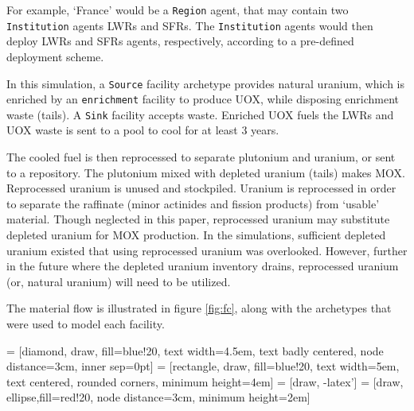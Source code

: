 For example, `France' would be a \texttt{Region} agent,
that may contain two \texttt{Institution} agents \glspl{LWR}
and \glspl{SFR}. The \texttt{Institution} agents would then deploy
\glspl{LWR} and \glspl{SFR} agents, respectively, according to a pre-defined deployment
scheme. 

In this simulation, a \texttt{Source} facility archetype provides natural 
uranium, which is enriched by an \texttt{enrichment}
facility to produce \gls{UOX}, while disposing enrichment waste (tails). A 
\texttt{Sink} facility accepts waste. Enriched \gls{UOX} fuels
the \glspl{LWR} and \gls{UOX} waste is sent to a pool to cool for at least 3 
years.

The cooled fuel is then reprocessed to separate plutonium and uranium,
or sent to a repository.
The plutonium mixed with depleted uranium (tails) makes \gls{MOX}.
Reprocessed uranium is unused and stockpiled. Uranium is reprocessed
in order to separate the raffinate (minor actinides and fission products)
from `usable' material. Though neglected in this paper, reprocessed
uranium may substitute depleted uranium for \gls{MOX} production. In the
simulations, sufficient depleted uranium existed that using reprocessed
uranium was overlooked. However, further in the future where the depleted
uranium inventory drains, reprocessed uranium (or, natural uranium) will need to be utilized. 

The material flow is illustrated in figure \ref{fig:fc}, along with
the \Cyclus archetypes that were used to model each facility.



 = [diamond, draw, fill=blue!20, 
text width=4.5em, text badly centered, node distance=3cm, inner sep=0pt]
 = [rectangle, draw, fill=blue!20, 
text width=5em, text centered, rounded corners, minimum height=4em]
 = [draw, -latex']
 = [draw, ellipse,fill=red!20, node distance=3cm,
minimum height=2em]


